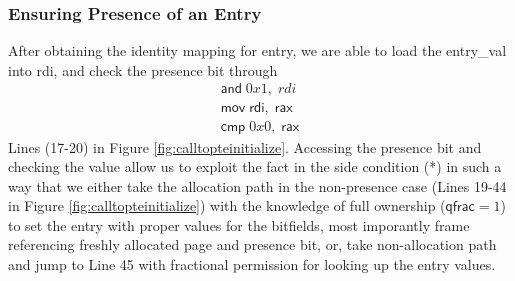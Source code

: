  \subsubsection{Ensuring Presence of an Entry}
 After obtaining the identity mapping for \textsf{entry}, we are able to load the \textsf{entry\_val} into \textsf{rdi}, and check the presence bit through
 \[ \begin{array}{l}
   \mathsf{and }\; 0x1, \;rdi \\
   \mathsf{mov } \;\mathsf{rdi}, \; \mathsf{rax} \\
   \mathsf{cmp } \; 0x0, \;\mathsf{rax}
 \end{array}
 \] Lines (17-20) in Figure \ref{fig:calltopteinitialize}.
 Accessing the presence bit and checking the value allow  us to exploit the fact in the side condition (*) in such a way that we either take the allocation path in the non-presence case (Lines 19-44 in Figure \ref{fig:calltopteinitialize}) with the knowledge of full ownership ($\textsf{qfrac} = 1$) to set the entry with proper values for the bitfields, most imporantly frame referencing freshly allocated page and presence bit, or, take non-allocation path and jump to Line 45 with fractional permission for looking up the entry values.

